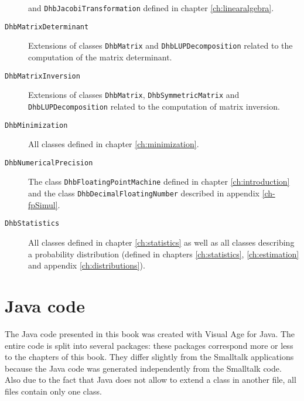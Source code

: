 \documentclass[twoside]{book}
\begin{document}
\begin{description}
  and {\tt DhbJacobiTransformation} defined in chapter \ref{ch:linearalgebra}.
  \item[\tt DhbMatrixDeterminant] Extensions of classes {\tt DhbMatrix} and
     {\tt DhbLUPDecomposition} related to the computation of the matrix determinant.
  \item[\tt DhbMatrixInversion] Extensions of classes {\tt DhbMatrix}, {\tt DhbSymmetricMatrix} and
     {\tt DhbLUPDecomposition} related to the computation of matrix inversion.
  \item[\tt DhbMinimization] All classes defined in chapter \ref{ch:minimization}.
  \item[\tt DhbNumericalPrecision] The class {\tt DhbFloatingPointMachine} defined in
  chapter \ref{ch:introduction} and the class {\tt DhbDecimalFloatingNumber} described in appendix \ref{ch-fpSimul}.
  \item[\tt DhbStatistics] All classes defined in chapter \ref{ch:statistics} as well as all
  classes describing a probability distribution (defined in chapters \ref{ch:statistics},
  \ref{ch:estimation} and appendix \ref{ch:distributions}).
\end{description}

\section{Java code}
The Java code presented in this book was created with Visual Age
for Java. The entire code is split into several packages: these
packages correspond more or less to the chapters of this book.
They differ slightly from the Smalltalk applications because the
Java code was generated independently from the Smalltalk code.
Also due to the fact that Java does not allow to extend a class in
another file, all files contain only one class.
\end{document}
